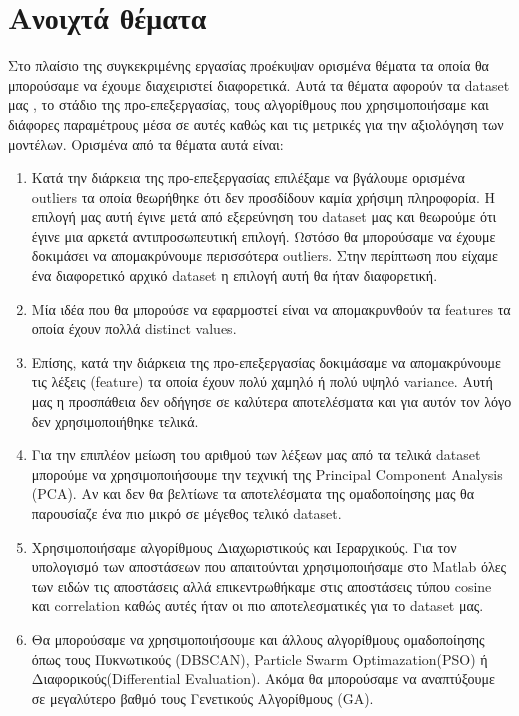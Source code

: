 \chapter{Ανοιχτά θέματα}\label{chapter:openissues}
Στο πλαίσιο της συγκεκριμένης εργασίας προέκυψαν ορισμένα θέματα τα οποία θα μπορούσαμε να έχουμε διαχειριστεί διαφορετικά. Αυτά τα θέματα αφορούν τα dataset μας , το στάδιο της προ-επεξεργασίας, τους αλγορίθμους που χρησιμοποιήσαμε και διάφορες παραμέτρους μέσα σε αυτές καθώς και τις μετρικές για την αξιολόγηση των μοντέλων. Ορισμένα από τα θέματα αυτά είναι:

\begin{enumerate}
    \item Κατά την διάρκεια της προ-επεξεργασίας επιλέξαμε να βγάλουμε ορισμένα outliers τα οποία θεωρήθηκε ότι δεν προσδίδουν καμία χρήσιμη πληροφορία. Η επιλογή μας αυτή έγινε μετά από εξερεύνηση του dataset μας και θεωρούμε ότι έγινε μια αρκετά αντιπροσωπευτική επιλογή. Ωστόσο θα μπορούσαμε να έχουμε δοκιμάσει να απομακρύνουμε περισσότερα outliers. Στην περίπτωση που είχαμε ένα διαφορετικό αρχικό dataset η επιλογή αυτή θα ήταν διαφορετική.
    \item Μία ιδέα που θα μπορούσε να εφαρμοστεί είναι να απομακρυνθούν τα features τα οποία έχουν πολλά distinct values.
    \item Επίσης, κατά την διάρκεια της προ-επεξεργασίας δοκιμάσαμε να απομακρύνουμε τις λέξεις (feature) τα οποία έχουν πολύ χαμηλό ή πολύ υψηλό variance. Αυτή μας η προσπάθεια δεν οδήγησε σε καλύτερα αποτελέσματα και για αυτόν τον λόγο δεν χρησιμοποιήθηκε τελικά.
    \item Για την επιπλέον μείωση του αριθμού των λέξεων μας από τα τελικά dataset μπορούμε να χρησιμοποιήσουμε την τεχνική της Principal Component Analysis (PCA). Αν και δεν θα βελτίωνε τα αποτελέσματα της ομαδοποίησης μας θα παρουσίαζε ένα πιο μικρό σε μέγεθος τελικό dataset.
    \item Χρησιμοποιήσαμε αλγορίθμους Διαχωριστικούς και Ιεραρχικούς. Για τον υπολογισμό των αποστάσεων που απαιτούνται χρησιμοποιήσαμε στο Matlab όλες των ειδών τις αποστάσεις αλλά επικεντρωθήκαμε στις αποστάσεις τύπου cosine και correlation καθώς αυτές ήταν οι πιο αποτελεσματικές για το dataset μας.
    \item Θα μπορούσαμε να χρησιμοποιήσουμε και άλλους αλγορίθμους ομαδοποίησης όπως τους Πυκνωτικούς (DBSCAN), Particle Swarm Optimazation(PSO) ή Διαφορικούς(Differential Evaluation). Ακόμα θα μπορούσαμε να αναπτύξουμε σε μεγαλύτερο βαθμό τους Γενετικούς Αλγορίθμους (GA).

\end{enumerate}
